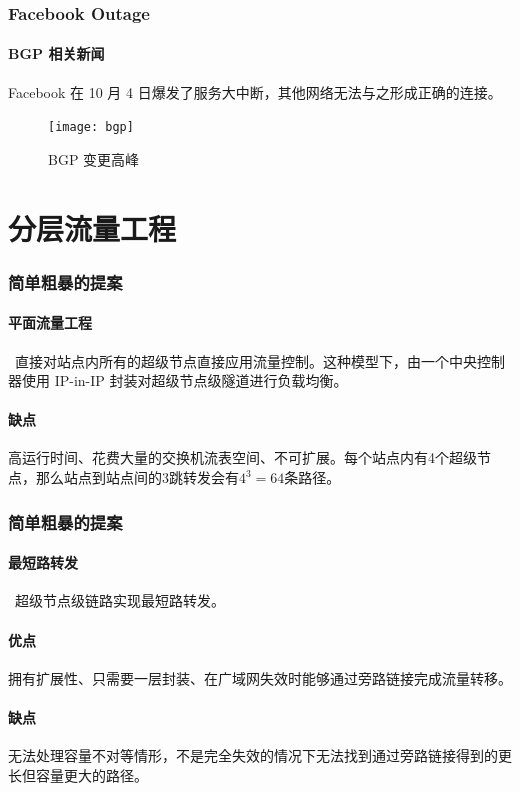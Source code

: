     \begin{frame}[plain]
        \frametitle{Facebook Outage}
        \framesubtitle{BGP 相关新闻}
        Facebook 在 10 月 4 日爆发了服务大中断，其他网络无法与之形成正确的连接。
        \begin{figure}
            \centering
            \texttt{[image: bgp]}
            \caption{BGP 变更高峰}
        \end{figure}
    \end{frame}

    \section{分层流量工程}

    \begin{frame}
        \frametitle{简单粗暴的提案}
        \framesubtitle{平面流量工程}
        ~直接对站点内所有的超级节点直接应用流量控制。这种模型下，由一个中央控制器使用 IP-in-IP 封装对超级节点级隧道进行负载均衡。

        \paragraph{缺点} 高运行时间、花费大量的交换机流表空间、不可扩展。每个站点内有4个超级节点，那么站点到站点间的3跳转发会有$4^3=64$条路径。
    \end{frame}

    \begin{frame}
        \frametitle{简单粗暴的提案}
        \framesubtitle{最短路转发}

        ~超级节点级链路实现最短路转发。

        \paragraph{优点}拥有扩展性、只需要一层封装、在广域网失效时能够通过\alert{旁路链接}完成流量转移。

        \paragraph{缺点}无法处理容量不对等情形，不是完全失效的情况下无法找到通过\alert{旁路链接}得到的更长但容量更大的路径。
        \hyperlink{asym<3>}{}
    \end{frame}

